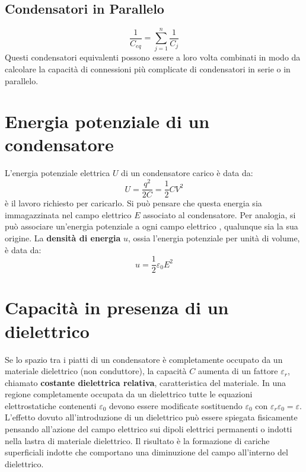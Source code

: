         \subsection{Condensatori in Parallelo}
            \begin{equation}
                \frac{1}{C_{eq}} = \sum_{j = 1}^{n} \frac{1}{C_j}
            \end{equation}
    Questi condensatori equivalenti possono essere a loro volta combinati in 
    modo da calcolare la capacità di connessioni più complicate di condensatori
    in serie o in parallelo.

    \section{Energia potenziale di un condensatore} L'energia potenziale 
    elettrica $U$ di un condensatore carico è data da:
        \begin{equation}
            U = \frac{q^2}{2C} = \frac{1}{2}CV^2
        \end{equation}
    è il lavoro richiesto per caricarlo. Si può pensare che questa energia sia 
    immagazzinata nel campo elettrico $E$ associato al condensatore. 
    Per analogia, si può associare un'energia potenziale a ogni campo elettrico
    , qualunque sia la sua origine. La \textbf{densità di energia} $u$, ossia
    l'energia potenziale per unità di volume, è data da:
        \begin{equation}
            u = \frac{1}{2}\varepsilon_0E^2
        \end{equation}
    
    \section{Capacità in presenza di un dielettrico} Se lo spazio tra i piatti
    di un condensatore è completamente occupato da un materiale dielettrico
    (non conduttore), la capacità $C$ aumenta di un fattore $\varepsilon_r$,
    chiamato \textbf{costante dielettrica relativa}, caratteristica del 
    materiale. In una regione completamente occupata da un dielettrico tutte le
    equazioni elettrostatiche contenenti $\varepsilon_0$ devono essere 
    modificate sostituendo $\varepsilon_0$ con $\varepsilon_r\varepsilon_0 =
    \varepsilon$.\\
    L'effetto dovuto all'introduzione di un dielettrico può essere spiegata
    fisicamente pensando all'azione del campo elettrico sui dipoli elettrici 
    permanenti o indotti nella lastra di materiale dielettrico. Il risultato è
    la formazione di cariche superficiali indotte che comportano una 
    diminuzione del campo all'interno del dielettrico.
        
